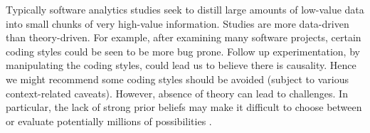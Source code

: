 \documentclass[preprint,10pt]{elsarticle}
\newcommand{\RED}{\color{red}}
\newcommand{\BLACK}{\color{black}}
\begin{document}
Typically software analytics studies seek to distill large amounts of low-value data into small chunks of very high-value information. Studies are more data-driven than theory-driven.  For example, after examining many software projects, certain coding styles could be seen to be more bug prone.  Follow up experimentation, by manipulating the coding styles, could lead us to believe there is causality. Hence we might recommend some coding styles should be avoided (subject to various context-related caveats). \RED However, absence of theory can lead to challenges.  In particular, the lack of strong prior beliefs may make it difficult to choose between or evaluate potentially millions of possibilities \cite{Gust93,Deva16}.  \BLACK



\end{document}
